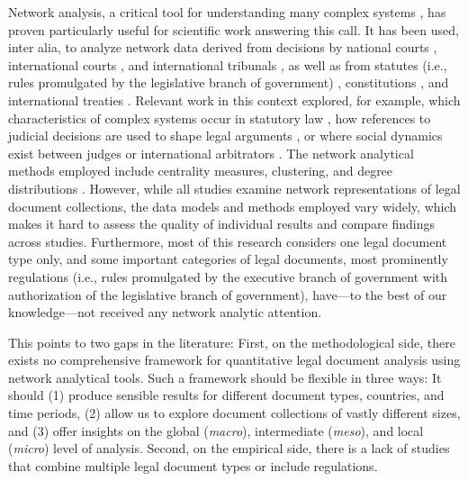 \documentclass[utf8,sort&compress,table,hidelinks]{frontiersFPHY} %
\begin{document}
Network analysis, a critical tool for understanding many complex systems \cite{amaral2004,albert2002,watts1998}, has proven particularly useful for scientific work answering this call.
It has been used, inter alia, to analyze network data derived from decisions by national courts \cite{coupette2019,winkels2019,black2013,lupu2013,bommarito2011,cross2010,fowler2007},
international courts \cite{olsen2020,alschner2018,larsson2017,tarissan2016a,panagis2015,pelc2014,lupu2012},
and international tribunals \cite{charlotin2017, langford2017},
as well as from statutes (i.e., rules promulgated by the legislative branch of government) \cite{katz2020,coupette2019a,boulet2018,koniaris2018,li2015,katz2014,bommarito2010},
constitutions \cite{lee2019,rutherford2018,rockmore2017},
and international treaties \cite{boulet2019,alschner2016,kim2013,kinne2013,saban2010}.
Relevant work in this context explored, for example, which characteristics of complex systems occur in statutory law \cite{katz2020,koniaris2018,li2015}, how references to judicial decisions are used to shape legal arguments \cite{larsson2017,black2013,lupu2013}, or where social dynamics exist between judges or international arbitrators \cite{katz2010,langford2017}.
The network analytical methods employed include centrality measures, clustering, and degree distributions \cite{katz2020,coupette2019,winkels2019,lee2019,alschner2016}.
However, while all studies examine network representations of legal document collections, the data models and methods employed vary widely, which makes it hard to assess the quality of individual results and compare findings across studies.
Furthermore, most of this research considers one legal document type only, 
and some important categories of legal documents, most prominently regulations (i.e., rules promulgated by the executive branch of government with authorization of the legislative branch of government), have---to the best of our knowledge---not received any network analytic attention.

This points to two gaps in the literature: 
First, on the methodological side, there exists no comprehensive framework for quantitative legal document analysis using network analytical tools.
Such a framework should be flexible in three ways:
It should (1) produce sensible results for different document types, countries, and time periods, 
(2) allow us to explore document collections of vastly different sizes, 
and (3) offer insights on the global (\emph{macro}), intermediate (\emph{meso}), and local (\emph{micro}) level of analysis. 
Second, on the empirical side, there is a lack of studies that combine multiple legal document types or include regulations.
\end{document}
